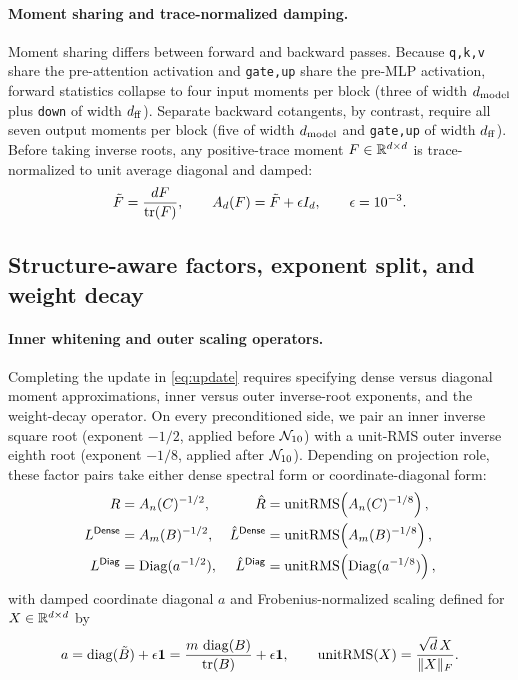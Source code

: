 \paragraph{Moment sharing and trace-normalized damping.}
Moment sharing differs between forward and backward passes. Because \texttt{q,k,v} share the pre-attention activation and \texttt{gate,up} share the pre-MLP activation, forward statistics collapse to four input moments per block (three of width $d_{\mathrm{model}}$ plus \texttt{down} of width $d_{\mathrm{ff}}$). Separate backward cotangents, by contrast, require all seven output moments per block (five of width $d_{\mathrm{model}}$ and \texttt{gate,up} of width $d_{\mathrm{ff}}$). Before taking inverse roots, any positive-trace moment $F\in\mathbb{R}^{d\times d}$ is trace-normalized to unit average diagonal and damped:
\begin{equation}
 \tilde F=\frac{dF}{\operatorname{tr}(F)},\qquad A_d(F)=\tilde F+\epsilon I_d,\qquad\epsilon=10^{-3}.
 \label{eq:trace_norm}
\end{equation}

\subsection{Structure-aware factors, exponent split, and weight decay}
\label{sec:factor_assignment}

\paragraph{Inner whitening and outer scaling operators.}
Completing the update in \cref{eq:update} requires specifying dense versus diagonal moment approximations, inner versus outer inverse-root exponents, and the weight-decay operator. On every preconditioned side, we pair an inner inverse square root (exponent $-1/2$, applied before $\mathcal{N}_{10}$) with a unit-RMS outer inverse eighth root (exponent $-1/8$, applied after $\mathcal{N}_{10}$). Depending on projection role, these factor pairs take either dense spectral form or coordinate-diagonal form:
\begin{align}
 R&=A_n(C)^{-1/2},&\hat R&=\operatorname{unitRMS}\!\left(A_n(C)^{-1/8}\right),\nonumber\\
 L^{\mathsf{Dense}}&=A_m(B)^{-1/2},&\hat L^{\mathsf{Dense}}&=\operatorname{unitRMS}\!\left(A_m(B)^{-1/8}\right),
 \label{eq:dense_roots}\\
 L^{\mathsf{Diag}}&=\operatorname{Diag}(a^{-1/2}),&\hat L^{\mathsf{Diag}}&=\operatorname{unitRMS}\!\left(\operatorname{Diag}(a^{-1/8})\right),
 \label{eq:diag_roots}
\end{align}
with damped coordinate diagonal $a$ and Frobenius-normalized scaling defined for $X\in\mathbb{R}^{d\times d}$ by
\[
 a=\operatorname{diag}(\tilde B)+\epsilon\mathbf1=\frac{m\,\operatorname{diag}(B)}{\operatorname{tr}(B)}+\epsilon\mathbf1,
 \qquad
 \operatorname{unitRMS}(X)=\frac{\sqrt d\,X}{\|X\|_F}.
\]

